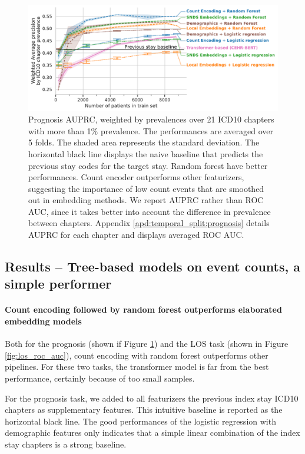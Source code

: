 \documentclass[french,12pt,twoside,a4paper]{book}
\begin{document}
\begin{figure}[!b]
  \centering
  \includegraphics[width=\linewidth]{img/chapter_3/prognosis/average_precision_score__c_weighted.pdf}
  \caption{Prognosis AUPRC, weighted by prevalences over 21
    ICD10 chapters with more than 1\% prevalence. The performances are averaged
    over 5 folds. The shaded area represents the standard deviation. The
    horizontal black line displays the naive baseline that predicts the previous
    stay codes for the target stay. Random forest have better performances.
    Count encoder outperforms other featurizers, suggesting the importance of
    low count events that are smoothed out in embedding methods. We report
    AUPRC rather than ROC AUC, since it takes better into account
    the difference in prevalence between chapters. Appendix
    \ref{apd:temporal_split:prognosis} details AUPRC for each
    chapter and displays averaged ROC AUC.}%
  \label{fig:prognosis_auprc}
\end{figure}

\subsection{Results -- Tree-based models on event counts, a simple performer}%
\label{subsec:predictive_models:results}

\paragraph{Count encoding followed by random forest outperforms elaborated
  embedding models}%

Both for the prognosis (shown if Figure \ref{fig:prognosis_auprc}) and the
LOS task (shown in Figure \ref{fig:los_roc_auc}), count encoding with random
forest outperforms other pipelines. For these two tasks, the transformer model
is far from the best performance, certainly because of too small samples.

For the prognosis task, we added to all featurizers the previous index stay
ICD10 chapters as supplementary features. This intuitive baseline is reported as
the horizontal black line. The good performances of the logistic regression with
demographic features only indicates that a simple linear combination of the
index stay chapters is a strong baseline.
\end{document}
